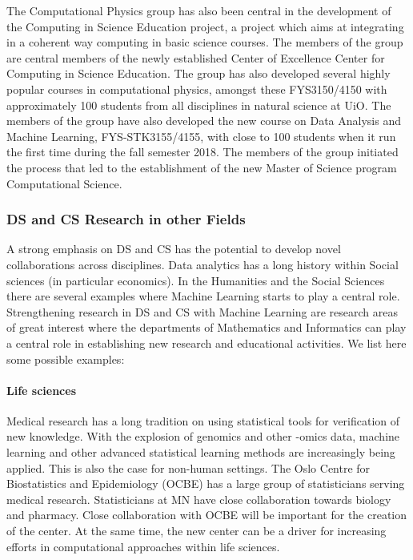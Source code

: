 \documentclass[a4paper,10pt]{article}
\begin{document}
The Computational Physics group has also been central in the development of the Computing in Science Education project, a project which aims at integrating in a coherent way computing in basic science courses. The members of the group are central members of the newly established Center of Excellence Center for Computing in Science Education. 
The group has also developed several highly popular courses in computational physics, amongst these FYS3150/4150 with approximately 100 students from all disciplines in natural science at UiO. The members of the group have also developed the new course on Data Analysis and Machine Learning, FYS-STK3155/4155, with close to 100 students when it run the first time during the fall semester 2018. The members of the group initiated the process that led to the establishment of the new Master of Science program Computational Science. 



\subsubsection*{DS and CS Research in other Fields}

A strong emphasis on DS and CS has the potential to develop novel collaborations across disciplines. Data analytics has a long history within Social sciences (in particular economics). In the Humanities and the Social Sciences there are several examples where Machine Learning starts to play a central role. Strengthening research in DS and CS with Machine Learning are research areas of great interest where the departments of Mathematics and Informatics can play a central role in establishing new research and educational activities. We list here some possible examples:

\paragraph{Life sciences}
Medical research has a long tradition on using statistical tools for verification of new knowledge. With the explosion of genomics and other -omics data, machine learning and other advanced statistical learning methods are increasingly
being applied. This is also the case for non-human settings. The Oslo Centre for Biostatistics and Epidemiology (OCBE) has a large group of statisticians serving medical research. Statisticians at MN have close collaboration towards biology and pharmacy. Close collaboration with OCBE will be important for the creation of the center. At the same time, the new center can be a driver for increasing efforts in computational approaches within life sciences.
\end{document}
